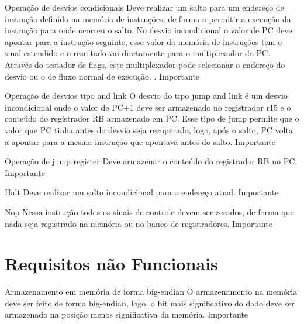 \documentclass{report}
\begin{document}
\begin{functional}
       \requirement
      {Operação de desvios condicionais}
      {Deve realizar um salto para um endereço de instrução definido na memória de instruções, de forma a permitir a execução da instrução para onde ocorreu o salto. No desvio incondicional o valor de PC deve apontar para a instrução seguinte, esse valor da memória de instruções tem o sinal estendido e o resultado vai diretamente para o multiplexador do PC. Através do testador de flags, este multiplexador pode selecionar o endereço do desvio ou o de fluxo normal de execução.
.}
      {Importante}
      
      \requirement
      {Operação de desvios tipo and link}
      {O desvio do tipo jump and link é um desvio incondicional onde o valor de PC+1 deve ser armazenado no registrador r15 e o conteúdo do registrador RB armazenado em PC. Esse tipo de jump permite que o valor que PC tinha antes do desvio seja recuperado, logo, após o salto, PC volta a apontar para a mesma instrução que apontava antes do salto.}
      {Importante}
      
       \requirement
      {Operação de jump register}
      {Deve armazenar o conteúdo do registrador RB no PC.}
      {Importante}
      
      \requirement
      {Halt}
      {Deve realizar um salto incondicional para o endereço atual.}
      {Importante}
      
      \requirement
      {Nop}
      {Nessa instrução todos os sinais de controle devem ser zerados, de forma que nada seja registrado na memória ou no banco de registradores.}
      {Importante}
      
    \end{functional}

\section{Requisitos não Funcionais}

  \begin{nonfunctional}
    \requirement
    {Armazenamento em memória de forma big-endian}
    {O armazenamento na memória deve ser feito de forma big-endian, logo, o bit mais significativo do dado deve ser armazenado na posição menos significativa da memória.}
    {Importante}
  \end{nonfunctional}


% 
% 
\end{document}
